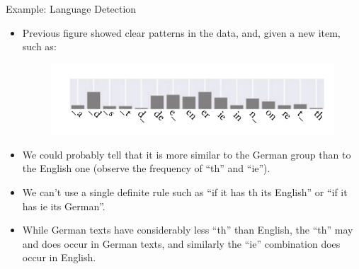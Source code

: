 \documentclass[handout]{beamer}
\begin{document}
\begin{frame}{Example: Language Detection}
\begin{scriptsize}
\begin{itemize}
\item Previous figure showed clear patterns in the data, and, given a new item, such as:

\begin{figure}[htb]
	\centering
	 \includegraphics[scale=0.4]{pics/langbigramstest.png}
\end{figure}

\item We could probably tell that it is more similar to the German group than to the English one (observe the frequency of ``th'' and ``ie'').

\item We can't use a single definite rule such as ``if it has th its English'' or ``if it has ie its German''.
\item While German texts have considerably less ``th'' than English, the ``th'' may and does occur in German texts, and similarly the ``ie'' combination does occur in English.


\end{itemize}


\end{scriptsize}
\end{frame}
\end{document}
